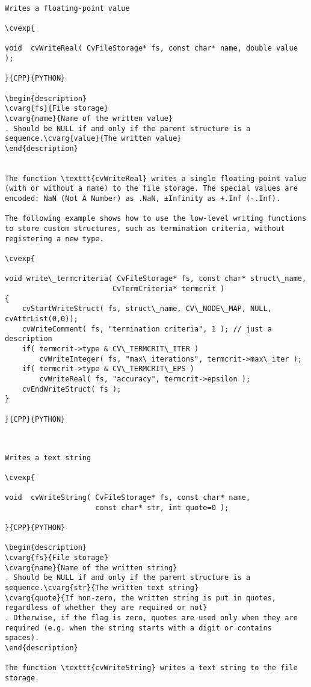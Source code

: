 \begin{verbatim}

Writes a floating-point value

\cvexp{

void  cvWriteReal( CvFileStorage* fs, const char* name, double value );

}{CPP}{PYTHON}

\begin{description}
\cvarg{fs}{File storage}
\cvarg{name}{Name of the written value}
. Should be NULL if and only if the parent structure is a sequence.\cvarg{value}{The written value}
\end{description}


The function \texttt{cvWriteReal} writes a single floating-point value (with or without a name) to the file storage. The special values are encoded: NaN (Not A Number) as .NaN, ±Infinity as +.Inf (-.Inf).

The following example shows how to use the low-level writing functions to store custom structures, such as termination criteria, without registering a new type.

\cvexp{

void write\_termcriteria( CvFileStorage* fs, const char* struct\_name,
                         CvTermCriteria* termcrit )
{
    cvStartWriteStruct( fs, struct\_name, CV\_NODE\_MAP, NULL, cvAttrList(0,0));
    cvWriteComment( fs, "termination criteria", 1 ); // just a description
    if( termcrit->type & CV\_TERMCRIT\_ITER )
        cvWriteInteger( fs, "max\_iterations", termcrit->max\_iter );
    if( termcrit->type & CV\_TERMCRIT\_EPS )
        cvWriteReal( fs, "accuracy", termcrit->epsilon );
    cvEndWriteStruct( fs );
}

}{CPP}{PYTHON}


\end{verbatim}
\begin{verbatim}

Writes a text string

\cvexp{

void  cvWriteString( CvFileStorage* fs, const char* name,
                     const char* str, int quote=0 );

}{CPP}{PYTHON}

\begin{description}
\cvarg{fs}{File storage}
\cvarg{name}{Name of the written string}
. Should be NULL if and only if the parent structure is a sequence.\cvarg{str}{The written text string}
\cvarg{quote}{If non-zero, the written string is put in quotes, regardless of whether they are required or not}
. Otherwise, if the flag is zero, quotes are used only when they are required (e.g. when the string starts with a digit or contains spaces).
\end{description}

The function \texttt{cvWriteString} writes a text string to the file storage.


\end{verbatim}
